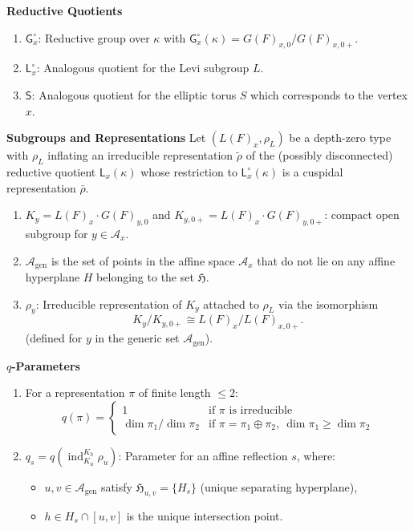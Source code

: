 \documentclass[american]{article}
\numberwithin{equation}{section}
\numberwithin{figure}{section}
\theoremstyle{plain}
\theoremstyle{definition}
\theoremstyle{remark}
\newcommand{\ind}{\operatorname{ind}}
\begin{document}
\vspace{1em}
\noindent \textbf{Reductive Quotients}
\begin{enumerate}
  \item \( \mathsf{G}_x^\circ \): Reductive group over \( \kappa \) with \( \mathsf{G}_x^\circ(\kappa) = G(F)_{x,0} / G(F)_{x,0+} \).
  \item \( \mathsf{L}_x^\circ \): Analogous quotient for the Levi subgroup \( L \).
  \item $\mathsf{S}$: Analogous quotient for the elliptic torus $S$ which corresponds to the vertex $x$.
\end{enumerate}
\vspace{1em}
\noindent \textbf{Subgroups and Representations} 
 Let $(L(F)_x,\rho_L)$ be a depth-zero type with $\rho_L$ inflating an irreducible representation $\widetilde{\rho}$ of the (possibly disconnected) reductive quotient $\mathsf{L}_x(\kappa)$ whose restriction to $\mathsf{L}_x^\circ(\kappa)$ is a cuspidal representation $\bar{\rho}$. 
\begin{enumerate}
  \item \( K_y = L(F)_{x} \cdot G(F)_{y,0} \) and \( K_{y,0+} = L(F)_{x} \cdot G(F)_{y,0+} \): compact open subgroup for \( y \in \mathcal{A}_x \).
  \item  \(\mathcal{A}_{\mathrm{gen}}\) is the set of points in the affine space \(\mathcal{A}_{x}\) that do not lie on any affine hyperplane \(H\) belonging to the set \(\mathfrak{H}\).
  \item \( \rho_y \): Irreducible representation of \( K_y \) attached to \( \rho_L \) via the isomorphism 
    \[
        K_y/K_{y,0+} \cong L(F)_{x}/L(F)_{x,0+}.
    \]
(defined for \( y \) in the generic set \( \mathcal{A}_{\mathrm{gen}} \)).

\end{enumerate}

\vspace{1em}
\noindent \textbf{\( q \)-Parameters}
\begin{enumerate}
  \item For a representation \( \pi \) of finite length \( \leq 2 \):
  \[
    q(\pi) = 
    \begin{cases} 
      1 & \text{if } \pi \text{ is irreducible} \\
      \dim \pi_1 / \dim \pi_2 & \text{if } \pi = \pi_1 \oplus \pi_2, \ \dim \pi_1 \geq \dim \pi_2
    \end{cases}
  \]
  \item \( q_s = q\left( \ind_{K_u}^{K_h} \rho_u \right) \): Parameter for an affine reflection \( s \), where:
  \begin{itemize}
    \item \( u, v \in \mathcal{A}_\mathrm{gen} \) satisfy \( \mathfrak{H}_{u,v} = \{H_s\} \) (unique separating hyperplane),
    \item \( h \in H_s \cap [u,v] \) is the unique intersection point.
  \end{itemize}
\end{enumerate}
\end{document}
